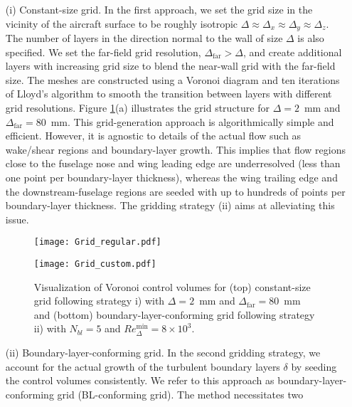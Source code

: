 \documentclass{ctr}
\begin{document}
\begin{itemize}
\item[(i)] Constant-size grid. In the first
  approach, we set the grid size in the vicinity of the aircraft
  surface to be roughly isotropic $\Delta\approx \Delta_x \approx
  \Delta_y \approx \Delta_z$. The number of layers in the direction
  normal to the wall of size $\Delta$ is also specified. We set the
  far-field grid resolution, $\Delta_\mathrm{far}>\Delta$, and create
  additional layers with increasing grid size to blend the near-wall
  grid with the far-field size. The meshes are constructed using a
  Voronoi diagram and ten iterations of Lloyd's algorithm to smooth
  the transition between layers with different grid
  resolutions. Figure \ref{fig:tbl_grids}(a) illustrates the grid
  structure for $\Delta=2$~mm and $\Delta_\mathrm{far}=80$~mm.  This
  grid-generation approach is algorithmically simple and
  efficient. However, it is agnostic to details of the actual flow
  such as wake/shear regions and boundary-layer growth. This implies
  that flow regions close to the fuselage nose and wing leading edge
  are underresolved (less than one point per boundary-layer
  thickness), whereas the wing trailing edge and the downstream-fuselage
  regions are seeded with up to hundreds of points per boundary-layer
  thickness. The gridding strategy (ii) aims at alleviating this issue.
%
\begin{figure}
  \begin{center}
    \texttt{[image: Grid\_regular.pdf]}
  \end{center}
    \begin{center}
  \texttt{[image: Grid\_custom.pdf]}
  \end{center}
  \caption{Visualization of Voronoi control volumes for (top)
    constant-size grid following strategy i) with $\Delta=2$~mm and
    $\Delta_\mathrm{far}=80$~mm and (bottom) boundary-layer-conforming grid
    following strategy ii) with $N_{bl} = 5$ and
    $Re_\Delta^\mathrm{min}=8 \times 10^3$.\label{fig:tbl_grids}}
\end{figure}
%
\item[(ii)] Boundary-layer-conforming grid. In the second
  gridding strategy, we account for the actual growth of the turbulent
  boundary layers $\delta$ by seeding the control volumes
  consistently. We refer to this approach as boundary-layer-conforming
  grid (BL-conforming grid). The method necessitates two

\end{itemize}
\end{document}
